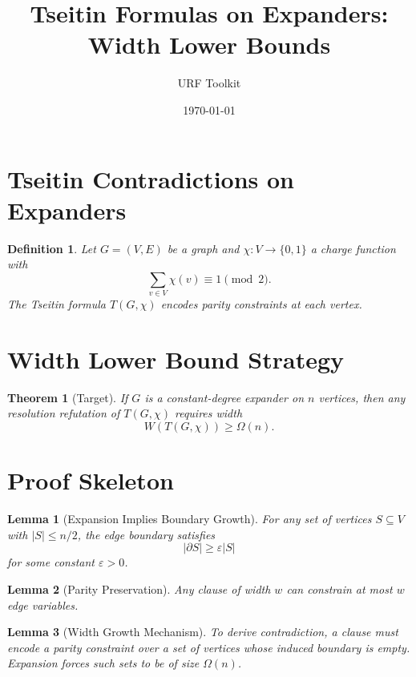 \documentclass{article}
\title{Tseitin Formulas on Expanders: Width Lower Bounds}
\author{URF Toolkit}
\date{\today}
\newtheorem{theorem}{Theorem}
\newtheorem{lemma}{Lemma}
\newtheorem{definition}{Definition}
\begin{document}
\maketitle

\section{Tseitin Contradictions on Expanders}

\begin{definition}
Let $G=(V,E)$ be a graph and $\chi:V\to\{0,1\}$ a charge function with
\[
\sum_{v\in V}\chi(v)\equiv 1 \pmod 2.
\]
The Tseitin formula $T(G,\chi)$ encodes parity constraints at each vertex.
\end{definition}

\section{Width Lower Bound Strategy}

\begin{theorem}[Target]
If $G$ is a constant-degree expander on $n$ vertices,
then any resolution refutation of $T(G,\chi)$
requires width
\[
W(T(G,\chi)) \ge \Omega(n).
\]
\end{theorem}

\section{Proof Skeleton}

\begin{lemma}[Expansion Implies Boundary Growth]
For any set of vertices $S\subseteq V$ with $|S|\le n/2$,
the edge boundary satisfies
\[
|\partial S| \ge \varepsilon |S|
\]
for some constant $\varepsilon>0$.
\end{lemma}

\begin{lemma}[Parity Preservation]
Any clause of width $w$ can constrain at most $w$ edge variables.
\end{lemma}

\begin{lemma}[Width Growth Mechanism]
To derive contradiction, a clause must encode a parity constraint
over a set of vertices whose induced boundary is empty.
Expansion forces such sets to be of size $\Omega(n)$.
\end{lemma}
\end{document}
